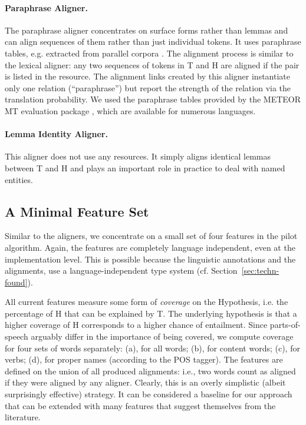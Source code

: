 \documentclass[11pt,letterpaper]{article}
\begin{document}
\paragraph{Paraphrase Aligner.} The paraphrase aligner concentrates on
surface forms rather than lemmas and can align sequences of them
rather than just individual tokens. It uses paraphrase tables, e.g.
extracted from parallel corpora
\cite{bannard05:_parap_bilin_paral_corpor}. The alignment process is
similar to the lexical aligner: any two sequences of tokens in T and H 
are aligned if the pair is listed in the resource.  The alignment
links created by this aligner instantiate only one relation
(``paraphrase'') but report the strength of the relation via the
translation probability. We used the paraphrase tables provided by the
METEOR MT evaluation package \cite{denkowski-lavie:2014:W14-33}, which
are available for numerous languages. 

\paragraph{Lemma Identity Aligner.} This aligner does not use any
resources. It simply aligns identical lemmas between T and H and plays
an important role in practice to deal with named entities.

\subsection{A Minimal Feature Set} 

Similar to the aligners, we concentrate on a small set of four
features in the pilot algorithm. Again, the features are completely
language independent, even at the implementation level. This is
possible because the linguistic annotations and the alignments, use a
language-independent type system (cf. Section~\ref{sec:techn-found}).

All current features measure some form of \textit{coverage} on the
Hypothesis, i.e. the percentage of H that can be explained by T. The
underlying hypothesis is that a higher coverage of H corresponds to a
higher chance of entailment. Since parts-of-speech arguably differ in
the importance of being covered, we compute coverage for four sets of
words separately: (a), for all words; (b), for content words; (c), for
verbs; (d), for proper names (according to the POS tagger). The
features are defined on the union of all produced alignments: i.e.,
two words count as aligned if they were aligned by any aligner. 
Clearly, this is an overly simplistic (albeit surprisingly effective)
strategy. It can be considered a baseline for our approach that can be
extended with many features that suggest themselves from the
literature. 
\end{document}
